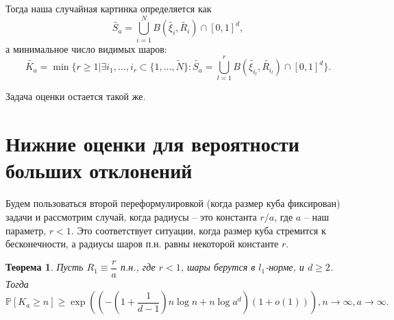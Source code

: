 \documentclass[12pt]{article}
\theoremstyle{plain}
\newtheorem{thm}{Теорема} %
\theoremstyle{definition}
\theoremstyle{remark}
\def\geq{\geqslant}
\newcommand{\cuplim}{\bigcup\limits}
\newcommand{\PP}{\mathbb{P}}
\newcommand{\til}{\widetilde}
\begin{document}
Тогда наша случайная картинка определяется как $$\til{S_a} = \cuplim_{i=1}^N B(\til{\xi_i}, \til{R_i}) \cap [0,1]^d,$$ а минимальное число видимых шаров: $$\til{K_a} = \min \{r \geq 1 | \exists i_1, \ldots , i_r \subset \{1, \ldots , \til{N}\} : \til{S_a} = \cuplim_{l=1}^r B(\til{\xi_{i_l}}, \til{R_{i_l}}) \cap [0,1]^d\}.$$

Задача оценки остается такой же.

\section{Нижние оценки для вероятности больших отклонений}

Будем пользоваться второй переформулировкой (когда размер куба фиксирован) задачи и рассмотрим случай, когда радиусы -- это константа $r/a$, где $a$ -- наш параметр, $r<1$. Это соответствует ситуации, когда размер куба стремится к бесконечности, а радиусы шаров п.н. равны некоторой константе $r$.

\begin{thm}
Пусть $R_1\equiv \dfrac{r}{a}$ п.н., где $r<1$, шары берутся в $l_1$-норме, и $d\geq 2$. 
Тогда $$\PP[K_a \geq n] \geq \exp \left(\left(-\left(1+\dfrac{1}{d-1}\right)n\log n + n\log a^d\right) (1+o(1))\right), n \to \infty, a\to \infty.$$
\end{thm}{}
\end{document}
